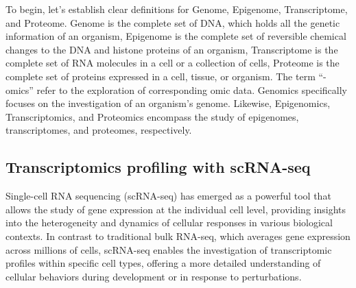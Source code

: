 To begin, let's establish clear definitions for Genome, Epigenome, Transcriptome, and Proteome. Genome is the complete set of DNA, which holds all the genetic information of an organism\citep{hubbard2002genome}, Epigenome is the complete set of reversible chemical changes to the DNA and histone proteins of an organism\citep{bernstein2007epigenome}, Transcriptome is the complete set of RNA molecules in a cell or a collection of cells\citep{haoudi2006proteome}, Proteome is the complete set of proteins expressed in a cell, tissue, or organism\citep{wang2009transcriptome}. The term “-omics” refer to the exploration of corresponding omic data. Genomics specifically focuses on the investigation of an organism's genome.  Likewise, Epigenomics, Transcriptomics, and Proteomics encompass the study of epigenomes, transcriptomes, and proteomes, respectively.


\subsection{Transcriptomics profiling with scRNA-seq}
\label{background:sec1:scRNA}

Single-cell RNA sequencing (scRNA-seq)\citep{singlecellsequencing2014, singlecellsequencing2015} has emerged as a powerful tool that allows the study of gene expression at the individual cell level, providing insights into the heterogeneity and dynamics of cellular responses in various biological contexts. In contrast to traditional bulk RNA-seq, which averages gene expression across millions of cells, scRNA-seq enables the investigation of transcriptomic profiles within specific cell types, offering a more detailed understanding of cellular behaviors during development or in response to perturbations.

